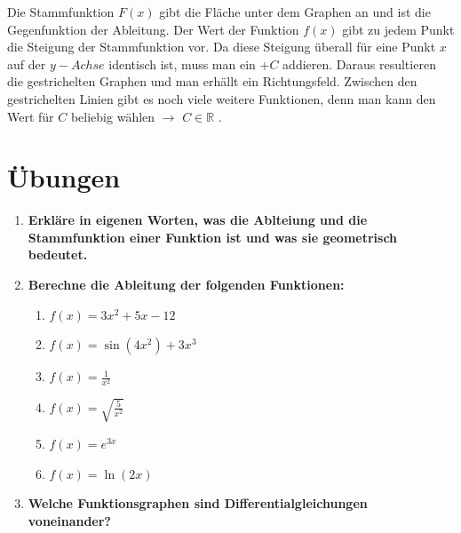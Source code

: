 \documentclass[a4paper,11pt]{report}
\begin{document}
Die Stammfunktion $F(x)$ gibt die Fläche unter dem Graphen an und ist die Gegenfunktion der Ableitung. Der Wert der Funktion $f(x)$ gibt zu jedem Punkt die Steigung der Stammfunktion vor.
Da diese Steigung überall für eine Punkt $x$ auf der $y-Achse$ identisch ist, muss man ein $+C$ addieren. Daraus resultieren die gestrichelten Graphen und man erhällt ein Richtungsfeld.
Zwischen den gestrichelten Linien gibt es noch viele weitere Funktionen, denn man kann den Wert für $C$ beliebig wählen $\rightarrow$ $C \in \mathbb{R}$ .

\newpage
\section{Übungen}
\begin{enumerate}
    \item \textbf{Erkläre in eigenen Worten, was die Ablteiung und die Stammfunktion einer Funktion ist und was sie geometrisch bedeutet.}
    \item \textbf{Berechne die Ableitung der folgenden Funktionen:}
    \begin{multicols}{2}
        \begin{enumerate}[label=(\alph*)]
            \item $f(x) = 3x^2 + 5x - 12$
            \item $f(x) = \sin(4x^2) + 3x^3$
            \item $f(x) = \frac{1}{x^2}$
            \item $f(x) = \sqrt{\frac{5}{x^2}}$
            \item $f(x) = e^{3x}$
            \item $f(x) = \ln(2x)$
        \end{enumerate}
    \end{multicols}
    \item \textbf{Welche Funktionsgraphen sind Differentialgleichungen voneinander?}
    \begin{multicols}{3}
        \begin{center}
\end{center}
\end{multicols}
\end{enumerate}
\end{document}
